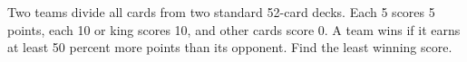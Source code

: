 Two teams divide all cards from two standard 52-card decks. Each 5 scores 5 points, each 10 or king scores 10, and other cards score 0. A team wins if it earns at least 50 percent more points than its opponent. Find the least winning score.
